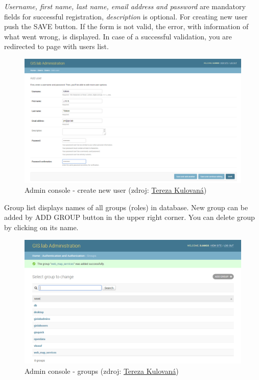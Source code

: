 \textit{Username, first name, last name, email address and password} are mandatory fields for successful registration, \textit{description} is optional. For creating new user push the \textsf{SAVE} button. If the form is not valid, the error, with information of what went wrong, is displayed. In case of a successful validation, you are redirected to page with users list.
\begin{figure}[H] \centering
    \includegraphics[width=430pt]{./prilohy/guide-admin-user-add.png}
    \caption[Admin console - create new user]{Admin console - create new user (zdroj:
	\href{}{Tereza Kulovaná})}
	\label{fig:guide-admin-user-add}
\end{figure}

Group list displays names of all groups (roles) in database. New group can be added by \textsf{ADD GROUP} button in the upper right corner. You can delete group by clicking on its name.
\begin{figure}[H] \centering
    \includegraphics[width=430pt]{./prilohy/guide-admin-groups.png}
    \caption[Admin console - groups]{Admin console - groups (zdroj:
	\href{}{Tereza Kulovaná})}
	\label{fig:guide-admin-groups}
\end{figure}

